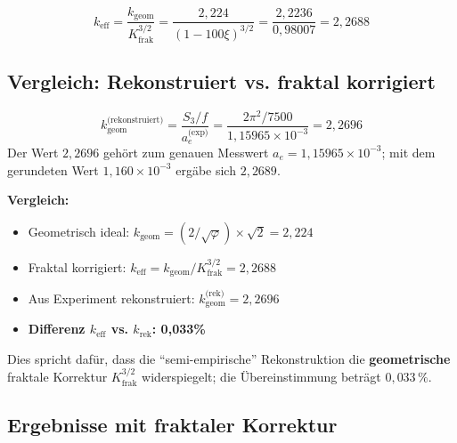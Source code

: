 	\begin{equation}
		\boxed{k_\text{eff} = \frac{k_\text{geom}}{K_\text{frak}^{3/2}} = \frac{2{,}224}{(1-100\xi)^{3/2}} = \frac{2{,}2236}{0{,}98007} = 2{,}2688}
	\end{equation}
	
	\subsection{Vergleich: Rekonstruiert vs. fraktal korrigiert}
	
	\begin{equation}
		k_{\text{geom}}^{\text{(rekonstruiert)}} = \frac{S_3/f}{a_e^{\text{(exp)}}} = \frac{2\pi^2 / 7500}{1{,}15965 \times 10^{-3}} = 2{,}2696
	\end{equation}
	Der Wert $2{,}2696$ gehört zum genauen Messwert $a_e = 1{,}15965 \times 10^{-3}$; mit dem gerundeten Wert $1{,}160 \times 10^{-3}$ ergäbe sich $2{,}2689$.

	
	\textbf{Vergleich:}
	\begin{itemize}
		\item Geometrisch ideal: $k_{\text{geom}} = (2/\sqrt{\varphi}) \times \sqrt{2} = 2{,}224$
		\item Fraktal korrigiert: $k_{\text{eff}} = k_{\text{geom}} / K_\text{frak}^{3/2} = 2{,}2688$
		\item Aus Experiment rekonstruiert: $k_{\text{geom}}^{\text{(rek)}} = 2{,}2696$
		\item \textbf{Differenz $k_\text{eff}$ vs. $k_\text{rek}$: 0{,}033\%}
	\end{itemize}
	
	Dies spricht dafür, dass die \enquote{semi-empirische} Rekonstruktion die \textbf{geometrische} fraktale Korrektur $K_\text{frak}^{3/2}$ widerspiegelt; die Übereinstimmung beträgt $0{,}033\,\%$.
	
	\subsection{Ergebnisse mit fraktaler Korrektur}
	
	\begin{table}[h]
		\centering
		\caption{Absolutwerte mit geometrischem vs. fraktal korrigiertem $k_\text{eff}$}
	\end{table}
	
